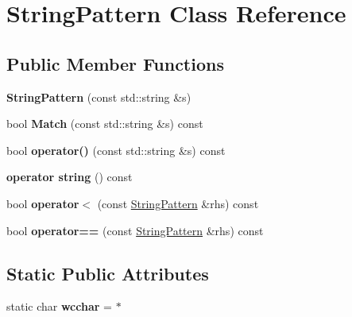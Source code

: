 \hypertarget{classStringPattern}{}\section{String\+Pattern Class Reference}
\label{classStringPattern}
\subsection*{Public Member Functions}
\begin{DoxyCompactItemize}
\item 
\mbox{\label{classStringPattern_a9ca35f0c291652320a8ace4a009111c3}} 
{\bfseries String\+Pattern} (const std\+::string \&s)
\item 
\mbox{\label{classStringPattern_afbe171e27548013aefac89175b4de2a5}} 
bool {\bfseries Match} (const std\+::string \&s) const
\item 
\mbox{\label{classStringPattern_a0f120204f0c81453f82c04b3f6757d9b}} 
bool {\bfseries operator()} (const std\+::string \&s) const
\item 
\mbox{\label{classStringPattern_a5f68ab8fe8a64c461f097f39a21a2c0f}} 
{\bfseries operator string} () const
\item 
\mbox{\label{classStringPattern_ab5106c700b1c50d9214f313d087c81dc}} 
bool {\bfseries operator$<$} (const \hyperlink{classStringPattern}{String\+Pattern} \&rhs) const
\item 
\mbox{\label{classStringPattern_a93d1d73459fdf3a431b5aa2cba0d7e5a}} 
bool {\bfseries operator==} (const \hyperlink{classStringPattern}{String\+Pattern} \&rhs) const
\end{DoxyCompactItemize}
\subsection*{Static Public Attributes}
\begin{DoxyCompactItemize}
\item 
\mbox{\label{classStringPattern_a57741305d6823a734add13455301384e}} 
static char {\bfseries wcchar} = \textquotesingle{}$\ast$\textquotesingle{}
\end{DoxyCompactItemize}
